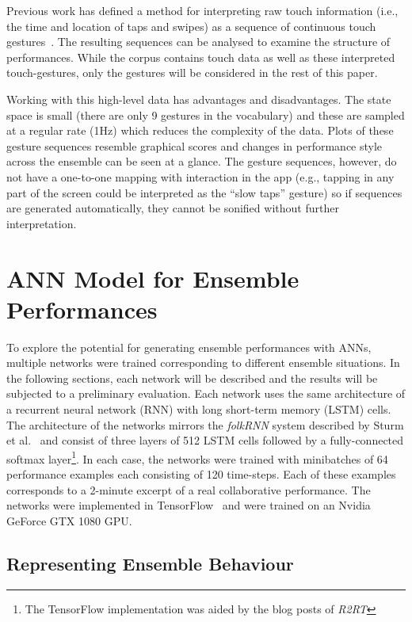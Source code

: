 \documentclass{article}
\begin{document}
Previous work has defined a method for interpreting raw touch
information (i.e., the time and location of taps and swipes) as a
sequence of continuous touch gestures~\cite{Martin:2015jk}. The
resulting sequences can be analysed to examine the structure of
performances. While the corpus contains touch data as well as these
interpreted touch-gestures, only the gestures will be considered in
the rest of this paper.

Working with this high-level data has advantages and disadvantages.
The state space is small (there are only 9 gestures in the vocabulary)
and these are sampled at a regular rate (1Hz) which reduces the
complexity of the data. Plots of these gesture sequences resemble
graphical scores and changes in performance style across the ensemble
can be seen at a glance. The gesture sequences, however, do not have a
one-to-one mapping with interaction in the app (e.g., tapping in any
part of the screen could be interpreted as the ``slow taps'' gesture)
so if sequences are generated automatically, they cannot be sonified
without further interpretation.

\section{ANN Model for Ensemble Performances}

To explore the potential for generating ensemble performances with
ANNs, multiple networks were trained corresponding to different
ensemble situations. In the following sections, each network will be
described and the results will be subjected to a preliminary
evaluation. Each network uses the same architecture of a recurrent
neural network (RNN) with long short-term memory (LSTM) cells. The
architecture of the networks mirrors the \emph{folkRNN} system
described by Sturm et al.~\cite{Sturm:2016rz} and consist of three
layers of 512 LSTM cells followed by a fully-connected softmax
layer\footnote{The TensorFlow implementation was aided by the blog
  posts of \emph{R2RT}\cite{R2RT-RNN:2016}}. In each case, the
networks were trained with minibatches of 64 performance examples each
consisting of 120 time-steps. Each of these examples corresponds to a
2-minute excerpt of a real collaborative performance. The networks
were implemented in TensorFlow~\cite{Abadi:2016wd} and were trained on
an Nvidia GeForce GTX 1080 GPU.

\subsection{Representing Ensemble Behaviour}
\end{document}
